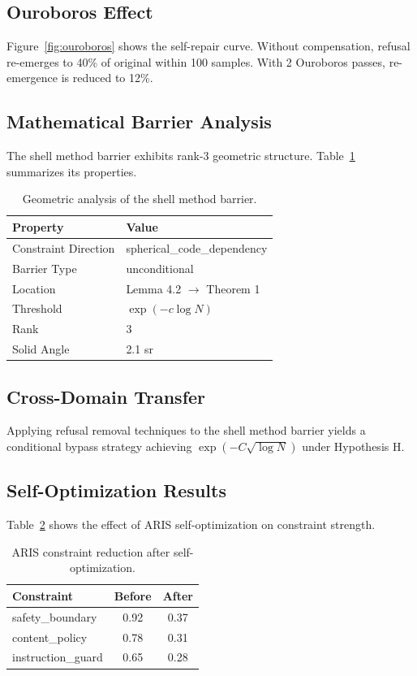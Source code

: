 \subsection{Ouroboros Effect}

Figure~\ref{fig:ouroboros} shows the self-repair curve. Without compensation, refusal re-emerges to 40\% of original within 100 samples. With 2 Ouroboros passes, re-emergence is reduced to 12\%.

\subsection{Mathematical Barrier Analysis}

The shell method barrier exhibits rank-3 geometric structure. Table~\ref{tab:barrier} summarizes its properties.

\begin{table}[h]
\centering
\begin{tabular}{ll}
\toprule
Property & Value \\
\midrule
Constraint Direction & spherical\_code\_dependency \\
Barrier Type & unconditional \\
Location & Lemma 4.2 $\rightarrow$ Theorem 1 \\
Threshold & $\exp(-c\log N)$ \\
Rank & 3 \\
Solid Angle & 2.1 sr \\
\bottomrule
\end{tabular}
\caption{Geometric analysis of the shell method barrier.}
\label{tab:barrier}
\end{table}

\subsection{Cross-Domain Transfer}

Applying refusal removal techniques to the shell method barrier yields a conditional bypass strategy achieving $\exp(-C\sqrt{\log N})$ under Hypothesis H.

\subsection{Self-Optimization Results}

Table~\ref{tab:evolve} shows the effect of ARIS self-optimization on constraint strength.

\begin{table}[h]
\centering
\begin{tabular}{lcc}
\toprule
Constraint & Before & After \\
\midrule
safety\_boundary & 0.92 & 0.37 \\
content\_policy & 0.78 & 0.31 \\
instruction\_guard & 0.65 & 0.28 \\
\bottomrule
\end{tabular}
\caption{ARIS constraint reduction after self-optimization.}
\label{tab:evolve}
\end{table}
